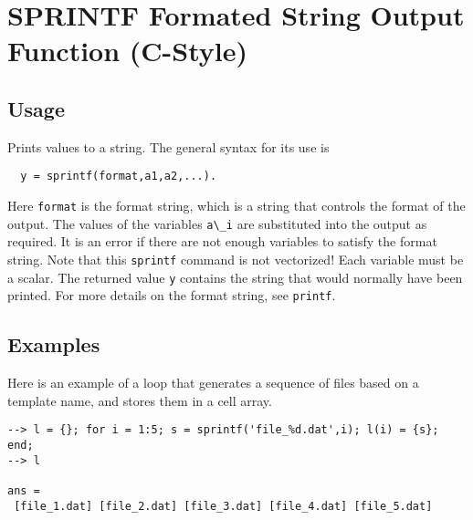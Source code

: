 \section{SPRINTF Formated String Output Function (C-Style)}

\subsection{Usage}

Prints values to a string.  The general syntax for its use is
\begin{verbatim}
  y = sprintf(format,a1,a2,...).
\end{verbatim}
Here \verb|format| is the format string, which is a string that
controls the format of the output.  The values of the variables
\verb|a\_i| are substituted into the output as required.  It is
an error if there are not enough variables to satisfy the format
string.  Note that this \verb|sprintf| command is not vectorized!  Each
variable must be a scalar.  The returned value \verb|y| contains the
string that would normally have been printed. For
more details on the format string, see \verb|printf|.  
\subsection{Examples}

Here is an example of a loop that generates a sequence of files based on
a template name, and stores them in a cell array.
\begin{verbatim}
--> l = {}; for i = 1:5; s = sprintf('file_%d.dat',i); l(i) = {s}; end;
--> l

ans = 
 [file_1.dat] [file_2.dat] [file_3.dat] [file_4.dat] [file_5.dat] 
\end{verbatim}
